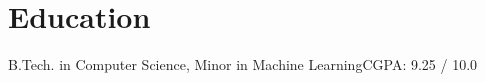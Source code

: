 \section{Education}
\resumeSubHeadingListStart

{B.Tech. in Computer Science, Minor in Machine Learning}{CGPA: 9.25 / 10.0}

\resumeSubHeadingListEnd